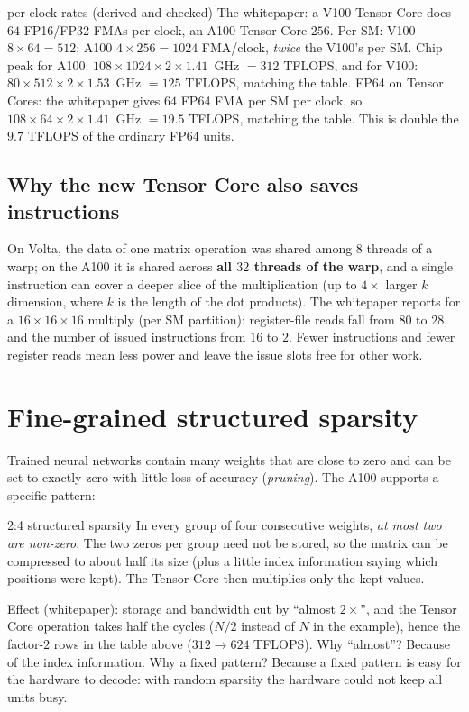 \begin{workedex}{per-clock rates (derived and checked)}
The whitepaper: a V100 Tensor Core does $64$ FP16/FP32 FMAs per clock, an A100 Tensor Core $256$. Per SM: V100 $8\times64=512$; A100 $4\times256=1024$ FMA/clock, \emph{twice} the V100's per SM.
Chip peak for A100: $108\times1024\times2\times1.41$~GHz $=312$ TFLOPS, and for V100: $80\times512\times2\times1.53$~GHz $=125$ TFLOPS, matching the table.
FP64 on Tensor Cores: the whitepaper gives $64$ FP64 FMA per SM per clock, so $108\times64\times2\times1.41$~GHz $=19.5$ TFLOPS, matching the table.
This is double the $9.7$ TFLOPS of the ordinary FP64 units.
\end{workedex}

\subsection{Why the new Tensor Core also saves instructions}

On Volta, the data of one matrix operation was shared among $8$ threads of a warp; on the A100 it is shared across \textbf{all $32$ threads of the warp}, and a single instruction can cover a deeper slice of the
multiplication (up to $4\times$ larger $k$ dimension, where $k$ is the length of the dot products). The whitepaper reports for a $16\times16\times16$ multiply (per SM partition): register-file reads fall from $80$ to $28$, and
the number of issued instructions from $16$ to $2$. Fewer instructions and fewer register reads mean less power and leave the issue slots free for other work.

\section{Fine-grained structured sparsity}
\oos

Trained neural networks contain many weights that are close to zero and can be set to exactly zero with little loss of accuracy (\emph{pruning}). The A100 supports a specific pattern:
\begin{definition}{2:4 structured sparsity}
In every group of four consecutive weights, \emph{at most two are non-zero}. The two zeros per group need not be stored, so the matrix can be compressed to about half its size (plus a little index information
saying which positions were kept). The Tensor Core then multiplies only the kept values.
\end{definition}
Effect (whitepaper): storage and bandwidth cut by ``almost $2\times$'', and the Tensor Core operation takes half the cycles ($N/2$ instead of $N$ in the example), hence the factor-$2$ rows in the table above ($312\to624$ TFLOPS).
Why ``almost''? Because of the index information. Why a fixed pattern? Because a fixed pattern is easy for the hardware to decode: with random sparsity the hardware could not keep all units busy.

